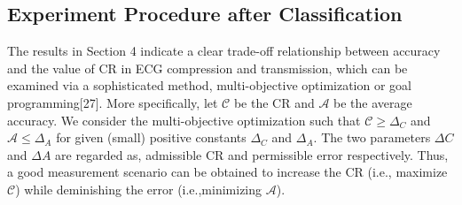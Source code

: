 \documentclass[journal]{IEEEtran}
\begin{document}
%
\subsection{Experiment Procedure after Classification}
The results in Section 4 indicate a clear trade-off relationship between accuracy and the value of CR in ECG compression and transmission, which can be examined via a sophisticated method, multi-objective optimization or goal programming[27]. More specifically, let $\mathcal{C}$ be the CR and $\mathcal{A}$ be the average accuracy. We consider the multi-objective optimization such that $\mathcal{C} \geq \Delta_{C}$ and $\mathcal{A} \le \Delta_{A}$ for given (small) positive constants $\Delta_{C}$ and $\Delta_{A}$. The two parameters $\Delta C$ and $\Delta A$ are regarded as, admissible CR and permissible error respectively. Thus, a good measurement scenario can be obtained to increase the CR (i.e., maximize $\mathcal{C}$) while deminishing the error (i.e.,minimizing $\mathcal{A}$).

\end{document}
